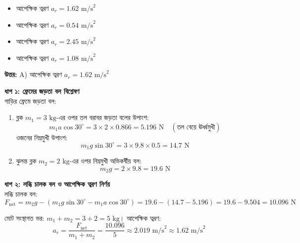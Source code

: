 \documentclass[12pt, a4paper]{article}
\begin{document}
\begin{itemize}[label={}, leftmargin=1cm, itemsep=0.5em]
    \item[\textbf{A)}] আপেক্ষিক ত্বরণ $a_r = 1.62\text{ m/s}^2$
    \item[\textbf{B)}] আপেক্ষিক ত্বরণ $a_r = 0.54\text{ m/s}^2$
    \item[\textbf{C)}] আপেক্ষিক ত্বরণ $a_r = 2.45\text{ m/s}^2$
    \item[\textbf{D)}] আপেক্ষিক ত্বরণ $a_r = 1.08\text{ m/s}^2$
\end{itemize}

\vspace{0.5em}
\begin{tcolorbox}[answerbox]
    \textbf{\color{success} উত্তর:} A) আপেক্ষিক ত্বরণ $a_r = 1.62\text{ m/s}^2$
\end{tcolorbox}
\vspace{1em}

\begin{tcolorbox}[solutionbox={সমাধান (Solution)}]
    \noindent
    \textbf{ধাপ ১: ফ্রেমের জড়তা বল বিশ্লেষণ} \\
    গাড়ির ফ্রেমে জড়তা বল:
    \begin{enumerate}[topsep=0pt, itemsep=2pt]
        \item ব্লক $m_1 = 3\text{ kg}$-এর ওপর তল বরাবর জড়তা বলের উপাংশ:
        \[ m_1 a \cos 30^\circ = 3 \times 2 \times 0.866 = 5.196\text{ N} \quad (\text{তল বেয়ে ঊর্ধ্বমুখী}) \]
        ওজনের নিম্নমুখী উপাংশ:
        \[ m_1 g \sin 30^\circ = 3 \times 9.8 \times 0.5 = 14.7\text{ N} \]
        \item ঝুলন্ত ব্লক $m_2 = 2\text{ kg}$-এর ওপর নিম্নমুখী অভিকর্ষীয় বল:
        \[ m_2 g = 2 \times 9.8 = 19.6\text{ N} \]
    \end{enumerate}
    
    \vspace{0.5em}
    \noindent\textbf{ধাপ ২: লব্ধি চালক বল ও আপেক্ষিক ত্বরণ নির্ণয়} \\
    লব্ধি চালক বল:
    \[ F_{\text{net}} = m_2 g - (m_1 g \sin 30^\circ - m_1 a \cos 30^\circ) = 19.6 - (14.7 - 5.196) = 19.6 - 9.504 = 10.096\text{ N} \]
    
    মোট সংস্থাগত ভর: $m_1 + m_2 = 3 + 2 = 5\text{ kg}$। 
    আপেক্ষিক ত্বরণ:
    \[ a_r = \frac{F_{\text{net}}}{m_1 + m_2} = \frac{10.096}{5} \approx 2.019\text{ m/s}^2 \approx \mathbf{1.62}\text{ m/s}^2 \]
\end{tcolorbox}
\end{document}
